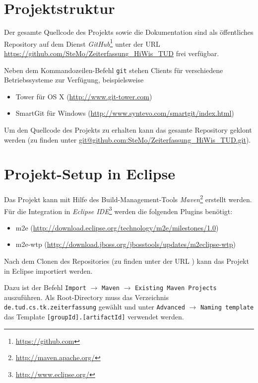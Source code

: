 \documentclass[article,colorback,accentcolor=tud2c]{tudreport}
\begin{document}
\section{Projektstruktur} %
\label{sec:projektstruktur}

Der gesamte Quellcode des Projekts sowie die Dokumentation sind als öffentliches Repository auf dem Dienst \emph{GitHub}\footnote{\url{https://github.com}} unter der URL \url{https://github.com/SteMo/Zeiterfassung_HiWis_TUD} frei verfügbar.

Neben dem Kommandozeilen-Befehl \texttt{git} stehen Clients für verschiedene Betriebssysteme zur Verfügung, beispielsweise

\begin{itemize}
    \item Tower für OS X (\url{http://www.git-tower.com})
    \item SmartGit für Windows (\url{http://www.syntevo.com/smartgit/index.html})
\end{itemize}

Um den Quellcode des Projekts zu erhalten kann das gesamte Repository geklont werden (zu finden unter \url{git@github.com:SteMo/Zeiterfassung_HiWis_TUD.git}).


\section{Projekt-Setup in Eclipse} %
\label{sec:projekt_setup_in_eclipse}

Das Projekt kann mit Hilfe des Build-Management-Tools \emph{Maven}\footnote{\url{http://maven.apache.org/}} erstellt werden. Für die Integration in \emph{Eclipse IDE}\footnote{\url{http://www.eclipse.org/}} werden die folgenden Plugins benötigt:

\begin{itemize}
    \item m2e (\url{http://download.eclipse.org/technology/m2e/milestones/1.0})
    \item m2e-wtp (\url{http://download.jboss.org/jbosstools/updates/m2eclipse-wtp})
\end{itemize}

Nach dem Clonen des Repositories (zu finden unter der URL ) kann das Projekt in Eclipse importiert werden.

Dazu ist der Befehl \texttt{Import} $\rightarrow$ \texttt{Maven} $\rightarrow$ \texttt{Existing Maven Projects} auszuführen. Als Root-Directory muss das Verzeichnis \texttt{de.tud.cs.tk.zeiterfassung} gewählt und unter \texttt{Advanced} $\rightarrow$ \texttt{Naming template} das Template \texttt{[groupId].[artifactId]} verwendet werden.
\end{document}
